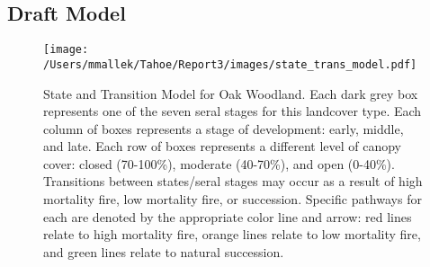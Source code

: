\subsection*{Draft Model}
\begin{figure}[htbp]
\centering
\texttt{[image: /Users/mmallek/Tahoe/Report3/images/state\_trans\_model.pdf]}
\caption{State and Transition Model for Oak Woodland. Each dark grey box represents one of the seven seral stages for this landcover type. Each column of boxes represents a stage of development: early, middle, and late. Each row of boxes represents a different level of canopy cover: closed (70-100\%), moderate (40-70\%), and open (0-40\%). Transitions between states/seral stages may occur as a result of high mortality fire, low mortality fire, or succession. Specific pathways for each are denoted by the appropriate color line and arrow: red lines relate to high mortality fire, orange lines relate to low mortality fire, and green lines relate to natural succession.} 
\label{oak_transmodel}
\end{figure}

